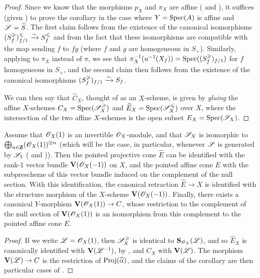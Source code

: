 \begin{proof}
Since we know that the morphisms $p_X$ and $\pi_X$ are affine ( and ), it suffices (given ) to prove the corollary in the case where $Y=\operatorname{Spec}(A)$ is affine and $\mathscr{S}=\widetilde{S}$.
The first claim follows from the existence of the canonical isomorphisms  $(S_f^\geqslant)_{f/1}^\leqslant \xrightarrow{\sim} S_f^\leqslant$ and from the fact that these isomorphisms are compatible with the map sending $f$ to $fg$ (where $f$ and $g$ are homogeneous in $S_+$).
Similarly, applying  to $\pi_X$ instead of $\pi$, we see that $\pi_X^{-1}(u^{-1}(X_f)) = \operatorname{Spec}((S_f^\geqslant)_{f/1})$ for $f$ homogeneous in $S_+$, and the second claim then follows from the existence of the canonical isomorphisms  $(S_f^\geqslant)_{f/1} \xrightarrow{\sim} S_f$.

We can then say that $\widehat{C}_X$, thought of as an $X$-scheme, is given by \emph{gluing} the affine $X$-schemes $C_X=\operatorname{Spec}(\mathscr{S}_X^\geqslant)$ and $\widehat{E}_X=\operatorname{Spec}(\mathscr{S}_X^\leqslant)$ over $X$, where the intersection of the two affine $X$-schemes is the open subset $E_X=\operatorname{Spec}(\mathscr{S}_X)$.
\end{proof}

\begin{corollary}[8.6.4]
\label{II.8.6.4}
Assume that $\mathscr{O}_X(1)$ is an invertible $\mathscr{O}_X$-module, and that $\mathscr{S}_X$ is isomorphic to $\bigoplus_{n\in\mathbf{Z}}(\mathscr{O}_X(1))^{\otimes n}$ (which will be the case, in particular, whenever $\mathscr{S}$ is generated by $\mathscr{S}_1$ ( and )).
Then the pointed projective cone $\widehat{E}$ can be identified with the rank-1 vector bundle $\mathbf{V}(\mathscr{O}_X(-1))$ on $X$, and the pointed affine cone $E$ with the subprescheme of this vector bundle induced on the complement of the null section.
With this identification, the canonical retraction $\widehat{E}\to X$ is identified with the structure morphism of the $X$-scheme $\mathbf{V}(\mathscr{O}_X(-1))$.
Finally, there exists a canonical $Y$-morphism $\bb{V}(\sh{O}_X(1))\to C$, whose restriction to the complement of the null section of $\mathbf{V}(\mathscr{O}_X(1))$ is an isomorphism from this complement to the pointed affine cone $E$.
\end{corollary}

\begin{proof}
If we write $\mathscr{L}=\mathscr{O}_X(1)$, then $\mathscr{S}_X^\geqslant$ is identical to $\mathbf{S}_{\mathscr{O}_X}(\mathscr{L})$, and so $\widehat{E}_X$ is canonically identified with $\mathbf{V}(\mathscr{L}^{-1})$, by , and $C_X$ with $\mathbf{V}(\mathscr{L})$.
The morphism $\bb{V}(\sh{L})\to C$ is the restriction of $\operatorname{Proj}(\widehat{\alpha})$, and the claims of the corollary are then particular cases of .
\end{proof}

